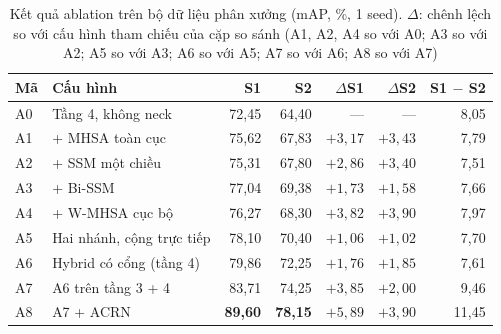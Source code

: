 \begin{table}[H]
\centering
\caption[Kết quả ablation trên bộ dữ liệu phân xưởng]{Kết quả ablation trên bộ dữ liệu phân xưởng (mAP, \%, 1 seed). $\Delta$: chênh lệch so với cấu hình tham chiếu của cặp so sánh (A1, A2, A4 so với A0; A3 so với A2; A5 so với A3; A6 so với A5; A7 so với A6; A8 so với A7)}
\label{tab:ablation-results}
\small
\begin{tabularx}{\textwidth}{lXrrrrr}
\toprule
\textbf{Mã} & \textbf{Cấu hình} & \textbf{S1} & \textbf{S2} & \textbf{$\Delta$S1} & \textbf{$\Delta$S2} & \textbf{S1 $-$ S2}\\
\midrule
A0 & Tầng 4, không neck & 72,45 & 64,40 & --- & --- & 8,05\\
A1 & + MHSA toàn cục & 75,62 & 67,83 & $+3{,}17$ & $+3{,}43$ & 7,79\\
A2 & + SSM một chiều & 75,31 & 67,80 & $+2{,}86$ & $+3{,}40$ & 7,51\\
A3 & + Bi-SSM & 77,04 & 69,38 & $+1{,}73$ & $+1{,}58$ & 7,66\\
A4 & + W-MHSA cục bộ & 76,27 & 68,30 & $+3{,}82$ & $+3{,}90$ & 7,97\\
A5 & Hai nhánh, cộng trực tiếp & 78,10 & 70,40 & $+1{,}06$ & $+1{,}02$ & 7,70\\
A6 & Hybrid có cổng (tầng 4) & 79,86 & 72,25 & $+1{,}76$ & $+1{,}85$ & 7,61\\
A7 & A6 trên tầng 3 + 4 & 83,71 & 74,25 & $+3{,}85$ & $+2{,}00$ & 9,46\\
A8 & A7 + ACRN & \textbf{89,60} & \textbf{78,15} & $+5{,}89$ & $+3{,}90$ & 11,45\\
\bottomrule
\end{tabularx}
\end{table}

